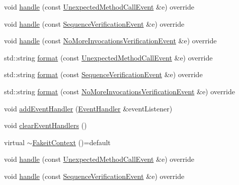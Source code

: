 \begin{DoxyCompactItemize}
\item 
void \mbox{\hyperlink{structfakeit_1_1FakeitContext_ac39067234f37a88f6c19440df0bc1b32}{handle}} (const \mbox{\hyperlink{structfakeit_1_1UnexpectedMethodCallEvent}{Unexpected\+Method\+Call\+Event}} \&e) override
\item 
void \mbox{\hyperlink{structfakeit_1_1FakeitContext_a6b77f1360c9f8f4165e1152173789d6e}{handle}} (const \mbox{\hyperlink{structfakeit_1_1SequenceVerificationEvent}{Sequence\+Verification\+Event}} \&e) override
\item 
void \mbox{\hyperlink{structfakeit_1_1FakeitContext_a09e2d757900d3c49a1b17694fa0395f1}{handle}} (const \mbox{\hyperlink{structfakeit_1_1NoMoreInvocationsVerificationEvent}{No\+More\+Invocations\+Verification\+Event}} \&e) override
\item 
std\+::string \mbox{\hyperlink{structfakeit_1_1FakeitContext_a4da398d63e45c922606bbd5aaff30f6e}{format}} (const \mbox{\hyperlink{structfakeit_1_1UnexpectedMethodCallEvent}{Unexpected\+Method\+Call\+Event}} \&e) override
\item 
std\+::string \mbox{\hyperlink{structfakeit_1_1FakeitContext_af163c4c51929ef14c1c5529f2f42c40b}{format}} (const \mbox{\hyperlink{structfakeit_1_1SequenceVerificationEvent}{Sequence\+Verification\+Event}} \&e) override
\item 
std\+::string \mbox{\hyperlink{structfakeit_1_1FakeitContext_a49fae6e849a57fff6906a1a313fb4267}{format}} (const \mbox{\hyperlink{structfakeit_1_1NoMoreInvocationsVerificationEvent}{No\+More\+Invocations\+Verification\+Event}} \&e) override
\item 
void \mbox{\hyperlink{structfakeit_1_1FakeitContext_a176ad0df1fcb2758648f2c9b6c8fdd0d}{add\+Event\+Handler}} (\mbox{\hyperlink{structfakeit_1_1EventHandler}{Event\+Handler}} \&event\+Listener)
\item 
void \mbox{\hyperlink{structfakeit_1_1FakeitContext_a65960b8d910f35fa5c3f596f693e5c17}{clear\+Event\+Handlers}} ()
\item 
virtual \mbox{\hyperlink{structfakeit_1_1FakeitContext_adfad726870dfba97246a9ddfddd3a3d5}{$\sim$\+Fakeit\+Context}} ()=default
\item 
void \mbox{\hyperlink{structfakeit_1_1FakeitContext_ac39067234f37a88f6c19440df0bc1b32}{handle}} (const \mbox{\hyperlink{structfakeit_1_1UnexpectedMethodCallEvent}{Unexpected\+Method\+Call\+Event}} \&e) override
\item 
void \mbox{\hyperlink{structfakeit_1_1FakeitContext_a6b77f1360c9f8f4165e1152173789d6e}{handle}} (const \mbox{\hyperlink{structfakeit_1_1SequenceVerificationEvent}{Sequence\+Verification\+Event}} \&e) override

\end{DoxyCompactItemize}
